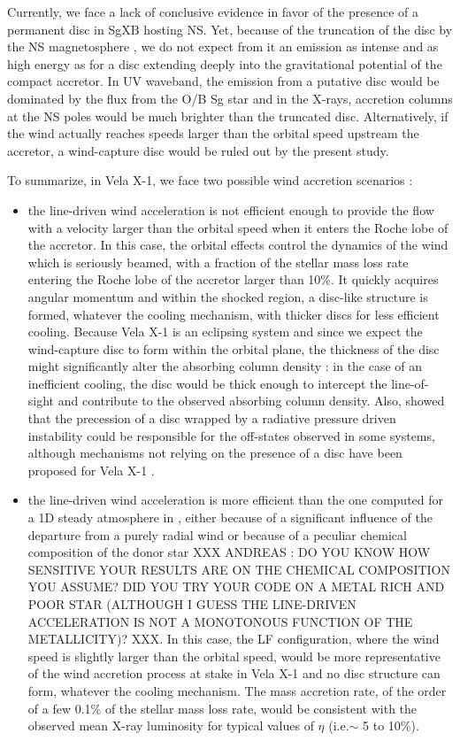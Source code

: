 \documentclass{aa}
\makeatletter
\newcommand{\sgx}{SgXB\xspace}
\newcommand*{\ns}{NS\@\xspace}
\newcommand*{\eg}{e.g.\@\xspace}
\newcommand*{\ie}{i.e.\@\xspace}
\makeatother
\begin{document}
Currently, we face a lack of conclusive evidence in favor of the presence of a permanent disc in \sgx hosting \ns \citep{Bozzo2008,Shakura2012,Romano2015,Hu2017}. Yet, because of the truncation of the disc by the \ns magnetosphere \citep{Ghosh1978}, we do not expect from it an emission as intense and as high energy as for a disc extending deeply into the gravitational potential of the compact accretor. In UV waveband, the emission from a putative disc would be dominated by the flux from the O/B Sg star and in the X-rays, accretion columns at the \ns poles would be much brighter than the truncated disc. Alternatively, if the wind actually reaches speeds larger than the orbital speed upstream the accretor, a wind-capture disc would be ruled out by the present study.

To summarize, in Vela X-1, we face two possible wind accretion scenarios :
\begin{itemize}
\item the line-driven wind acceleration is not efficient enough to provide the flow with a velocity larger than the orbital speed when it enters the Roche lobe of the accretor. In this case, the orbital effects control the dynamics of the wind which is seriously beamed, with a fraction of the stellar mass loss rate entering the Roche lobe of the accretor larger than 10\%. It quickly acquires angular momentum and within the shocked region, a disc-like structure is formed, whatever the cooling mechanism, with thicker discs for less efficient cooling. Because Vela X-1 is an eclipsing system and since we expect the wind-capture disc to form within the orbital plane, the thickness of the disc might significantly alter the absorbing column density : in the case of an inefficient cooling, the disc would be thick enough to intercept the line-of-sight and contribute to the observed absorbing column density. Also, \cite{Foulkes:2010wa} showed that the precession of a disc wrapped by a radiative pressure driven instability \citep{Petterson1977a,Petterson1977} could be responsible for the off-states observed in some systems, although mechanisms not relying on the presence of a disc have been proposed for Vela X-1 \citep[see \eg][]{Manousakis2015c}.
\item the line-driven wind acceleration is more efficient than the one computed for a 1D steady atmosphere in \cite{Sander2017}, either because of a significant influence of the departure from a purely radial wind or because of a peculiar chemical composition of the donor star XXX ANDREAS : DO YOU KNOW HOW SENSITIVE YOUR RESULTS ARE ON THE CHEMICAL COMPOSITION YOU ASSUME? DID YOU TRY YOUR CODE ON A METAL RICH AND POOR STAR (ALTHOUGH I GUESS THE LINE-DRIVEN ACCELERATION IS NOT A MONOTONOUS FUNCTION OF THE METALLICITY)? XXX. In this case, the LF configuration, where the wind speed is slightly larger than the orbital speed, would be more representative of the wind accretion process at stake in Vela X-1 and no disc structure can form, whatever the cooling mechanism. The mass accretion rate, of the order of a few 0.1\% of the stellar mass loss rate, would be consistent with the observed mean X-ray luminosity for typical values of $\eta$ (\ie $\sim$ 5 to 10\%).
\end{itemize}
\end{document}
